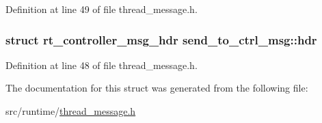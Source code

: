 Definition at line 49 of file thread\-\_\-message.\-h.

\hypertarget{structsend__to__ctrl__msg_a0081ea72ec0c3835e350ff584a3a4224}{
\subsubsection[{hdr}]{\setlength{\rightskip}{0pt plus 5cm}struct {\bf rt\-\_\-controller\-\_\-msg\-\_\-hdr} send\-\_\-to\-\_\-ctrl\-\_\-msg\-::hdr}}\label{structsend__to__ctrl__msg_a0081ea72ec0c3835e350ff584a3a4224}


Definition at line 48 of file thread\-\_\-message.\-h.



The documentation for this struct was generated from the following file\-:\begin{DoxyCompactItemize}
\item 
src/runtime/\hyperlink{thread__message_8h}{thread\-\_\-message.\-h}\end{DoxyCompactItemize}
